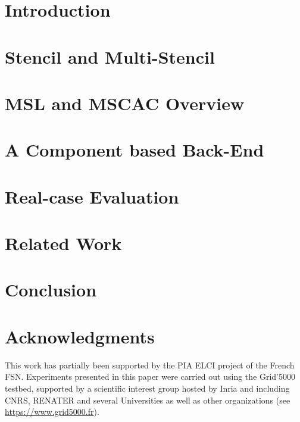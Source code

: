 \documentclass{sig-alternate}
\begin{document}

\section{Introduction}
\label{sect:intro}

\section{Stencil and Multi-Stencil}
\label{sect:concept}

\section{MSL and MSCAC Overview }
\label{sect:mscac}


\section{A Component based Back-End}
\label{sect:component}

\section{Real-case Evaluation}
\label{sect:eval}

\section{Related Work}
\label{sect:related}

\section{Conclusion}
\label{sect:conclusion}


\section{Acknowledgments}

This work has partially been supported by the PIA ELCI project of the French FSN.
Experiments presented in this paper were carried out using the
Grid'5000 testbed, supported by a scientific interest group hosted by
Inria and
including CNRS, RENATER and several Universities as well as
other
organizations (see \url{https://www.grid5000.fr}).



\end{document}
